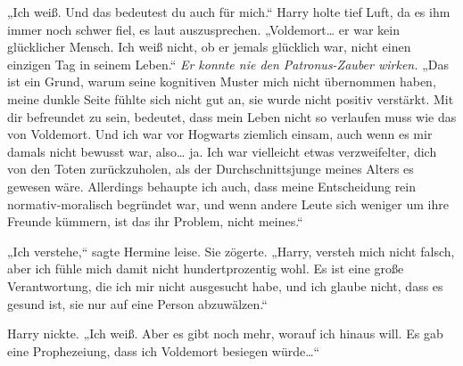 „Ich weiß. Und das bedeutest du auch für mich.“
Harry holte tief Luft, da es ihm immer noch schwer fiel, es laut auszusprechen.
„Voldemort… er war kein glücklicher Mensch. Ich weiß nicht, ob er jemals glücklich war, nicht einen einzigen Tag in seinem Leben.“
\emph{Er konnte nie den Patronus-Zauber wirken.}
„Das ist ein Grund, warum seine kognitiven Muster mich nicht übernommen haben, meine dunkle Seite fühlte sich nicht gut an, sie wurde nicht positiv verstärkt. Mit dir befreundet zu sein, bedeutet, dass mein Leben nicht so verlaufen muss wie das von Voldemort. Und ich war vor Hogwarts ziemlich einsam, auch wenn es mir damals nicht bewusst war, also… ja. Ich war vielleicht etwas verzweifelter, dich von den Toten zurückzuholen, als der Durchschnittsjunge meines Alters es gewesen wäre. Allerdings behaupte ich auch, dass meine Entscheidung rein normativ-moralisch begründet war, und wenn andere Leute sich weniger um ihre Freunde kümmern, ist das ihr Problem, nicht meines.“

„Ich verstehe,“ sagte Hermine leise. Sie zögerte. „Harry, versteh mich nicht falsch, aber ich fühle mich damit nicht hundertprozentig wohl. Es ist eine große Verantwortung, die ich mir nicht ausgesucht habe, und ich glaube nicht, dass es gesund ist, sie nur auf eine Person abzuwälzen.“

Harry nickte.
„Ich weiß. Aber es gibt noch mehr, worauf ich hinaus will. Es gab eine Prophezeiung, dass ich Voldemort besiegen würde…“


